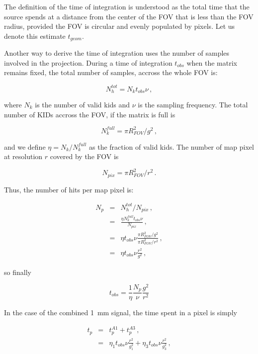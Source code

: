 The definition of the time of integration is understood as the total time that
the source spends at a distance from the center of the FOV that is less than the
FOV radius, provided the FOV is circular and evenly populated by pixels. Let us
denote this estimate $t_{geom}$.

Another way to derive the time of integration uses the number of samples
involved in the projection. During a time of integration $t_{obs}$ when the
matrix remains fixed, the total number of samples, accross the whole FOV
is:

\begin{equation}
N_h^{tot} = N_k t_{obs} \nu \,,
\end{equation}

\noindent where $N_k$ is the number of valid kids and $\nu$ is the sampling frequency. The
total number of KIDs accross the FOV, if the matrix is full is

\begin{equation}
N_k^{full} = \pi R_{FOV}^2/g^2\, ,
\end{equation}

\noindent and we define $\eta = N_k/N_k^{full}$ as the fraction of valid kids. The number
of map pixel at resolution $r$ covered by the FOV is

\begin{equation}
N_{pix} = \pi R_{FOV}^2/r^2\, .
\end{equation}

Thus, the number of hits per map pixel is:

\begin{eqnarray}
N_p &=& N_h^{tot}/N_{pix}\,, \nonumber\\
 &=& \frac{\eta N_k^{full} t_{obs} \nu}{N_{pix}}\,, \nonumber\\
&=& \eta t_{obs}\nu \frac{\pi R_{FOV}^2/g^2}{\pi R_{FOV}^2/r^2}\,, \nonumber\\
&=& \eta t_{obs}\nu \frac{r^2}{g^2}\,, \nonumber
\end{eqnarray}

so finally

\begin{equation}
t_{obs} = \frac{1}{\eta}\frac{N_p}{\nu}\frac{g^2}{r^2}
\label{eq:t_obs}
\end{equation}

In the case of the combined 1~mm signal, the time spent in a pixel is simply

\begin{eqnarray}
t_p &=& t_p^{A1} + t_p^{A3}\,, \nonumber\\
&=&\eta_1 t_{obs}\nu \frac{r^2}{g_1^2} + \eta_3 t_{obs}\nu \frac{r^2}{g_3^2}\,, \nonumber
\end{eqnarray}

